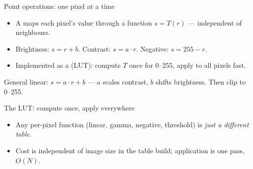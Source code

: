 \documentclass[10pt,aspectratio=169]{beamer}
\begin{document}
\begin{frame}{Point operations: one pixel at a time}
  \begin{itemize}
    \item A  maps each pixel's value through a function $s = T(r)$ — independent of neighbours.
    \item Brightness: $s = r + b$. Contrast: $s = a\cdot r$. Negative: $s = 255 - r$.
    \item Implemented as a  (LUT): compute $T$ once for 0--255, apply to all pixels fast.
  \end{itemize}
  \begin{mathbox}
    General linear: $s = a\cdot r + b$ — $a$ scales contrast, $b$ shifts brightness. Then clip to 0--255.
  \end{mathbox}
\end{frame}

\begin{frame}{The LUT: compute once, apply everywhere}
  \begin{center}
  \end{center}
  \begin{itemize}
    \item Any per-pixel function (linear, gamma, negative, threshold) is \emph{just a different table}.
    \item Cost is independent of image size in the table build; application is one pass, $O(N)$.
  \end{itemize}
\end{frame}
\end{document}
